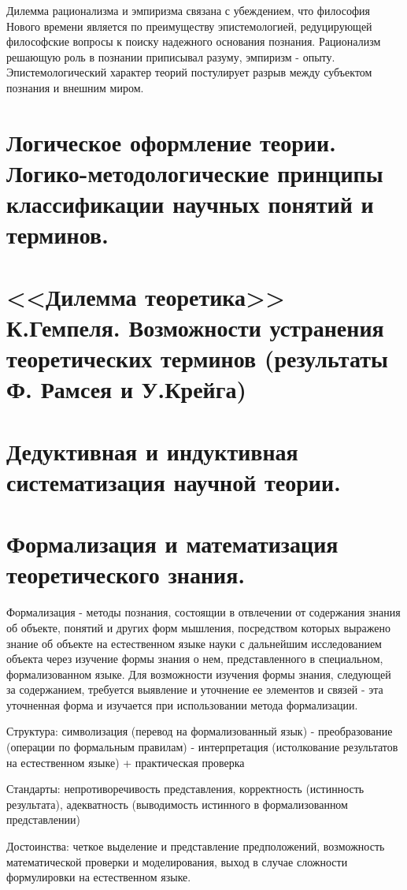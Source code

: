\documentclass[12pt, specialist, subf, substylefile = spbu.rtx]{disser}
\begin{document}
Дилемма рационализма и эмпиризма связана с убеждением, что философия Нового времени является по преимуществу эпистемологией, редуцирующей философские вопросы к поиску надежного основания познания. Рационализм решающую роль в познании приписывал разуму, эмпиризм - опыту. Эпистемологический характер теорий постулирует разрыв между субъектом познания и внешним миром.

\section{Логическое оформление теории. Логико-методологические принципы классификации научных понятий и терминов.}

\section{<<Дилемма теоретика>> К.Гемпеля. Возможности устранения теоретических терминов (результаты Ф. Рамсея и У.Крейга)}

\section{Дедуктивная и индуктивная систематизация научной теории.}

\section{Формализация и математизация теоретического знания.}
Формализация - методы познания, состоящии в отвлечении от содержания знания об объекте, понятий и других форм мышления, посредством которых выражено знание об объекте на естественном языке науки с дальнейшим исследованием объекта через изучение формы знания о нем, представленного в специальном, формализованном языке. Для возможности изучения формы знания, следующей за содержанием, требуется выявление и уточнение ее элементов и связей - эта уточненная форма и изучается при использовании метода формализации.

Структура: символизация (перевод на формализованный язык) - преобразование (операции по формальным правилам) - интерпретация (истолкование результатов на естественном языке) + практическая проверка

Стандарты: непротиворечивость представления, корректность (истинность результата), адекватность (выводимость истинного в формализованном представлении)

Достоинства: четкое выделение и представление предположений, возможность математической проверки и моделирования, выход в случае сложности формулировки на естественном языке.
\end{document}
